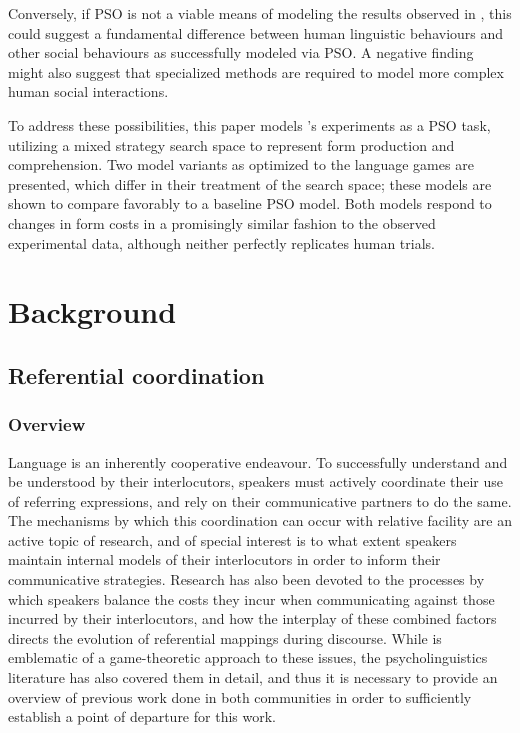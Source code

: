 \documentclass[12pt,a4paper]{article}
\begin{document}
Conversely, if PSO is not a viable means of modeling the results observed in \citeauthor{rohde2012}, this could suggest a fundamental difference between human linguistic behaviours and other social behaviours as successfully modeled via PSO. A negative finding might also suggest that specialized methods are required to model more complex human social interactions.

To address these possibilities, this paper models \citeauthor{rohde2012}'s experiments as a PSO task, utilizing a mixed strategy search space to represent form production and comprehension. Two model variants as optimized to the \citeauthor{rohde2012} language games are presented, which differ in their treatment of the search space; these models are shown to compare favorably to a baseline PSO model. Both models respond to changes in form costs in a promisingly similar fashion to the observed experimental data, although neither perfectly replicates human trials.


\section{Background}
\subsection{Referential coordination}
\subsubsection{Overview}
Language is an inherently cooperative endeavour. To successfully understand and be understood by their interlocutors, speakers must actively coordinate their use of referring expressions, and rely on their communicative partners to do the same. The mechanisms by which this coordination can occur with relative facility are an active topic of research, and of special interest is to what extent speakers maintain internal models of their interlocutors in order to inform their communicative strategies. Research has also been devoted to the processes by which speakers balance the costs they incur when communicating against those incurred by their interlocutors, and how the interplay of these combined factors directs the evolution of referential mappings during discourse. While \citeauthor{rohde2012} is emblematic of a game-theoretic approach to these issues, the psycholinguistics literature has also covered them in detail, and thus it is necessary to provide an overview of previous work done in both communities in order to sufficiently establish a point of departure for this work.
\end{document}
